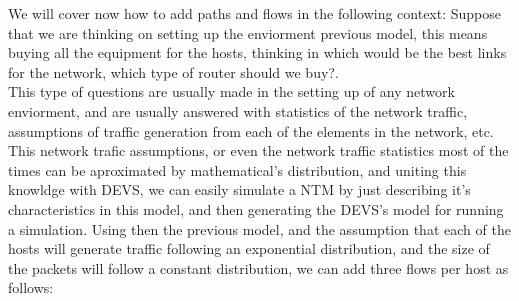 We will cover now how to add paths and flows in the following context: Suppose that we are thinking on setting up the enviorment previous model, this means buying all the equipment for the hosts, thinking in which would be the best links for the network, which type of router should we buy?. \\
This type of questions are usually made in the setting up of any network enviorment, and are usually answered with statistics of the network traffic, assumptions of traffic generation from each of the elements in the network, etc. This network trafic assumptions, or even the network traffic statistics most of the times can be aproximated by mathematical's distribution, and uniting this knowldge with DEVS, we can easily simulate a NTM by just describing it's characteristics in this model, and then generating the DEVS's model for running a simulation. Using then the previous model, and the assumption that each of the hosts will generate traffic following an exponential distribution, and the size of the packets will follow a constant distribution, we can add three flows per host as follows:

